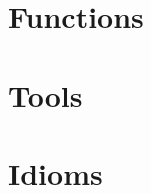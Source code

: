 \documentclass{beamer}
\begin{document}
\section{Functions}

\section{Tools}

\section{Idioms}

\begin{frame}
\end{frame}
\end{document}
